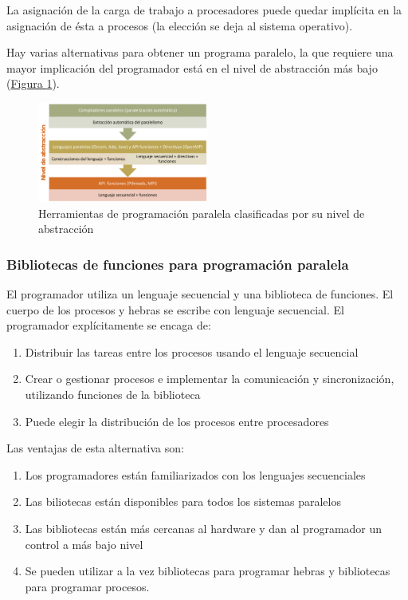 \documentclass[10pt,a4paper,spanish]{report}
\begin{document}
La asignación de la carga de trabajo a procesadores puede quedar implícita en la asignación de ésta a procesos (la elección se deja al sistema operativo).

Hay varias alternativas para obtener un programa paralelo, la que requiere una mayor implicación del programador está en el nivel de abstracción más bajo (\hyperref[herramientas_paralelas]{Figura \ref*{herramientas_paralelas}}).

\begin{figure}[!h]
\centering
\includegraphics[width=0.5\textwidth]{26}
\caption{Herramientas de programación paralela clasificadas por su nivel de abstracción}
\label{herramientas_paralelas}
\end{figure}

\textcolor[rgb]{0.2,0.4,0.8}{\subsubsection{Bibliotecas de funciones para programación paralela}}
El programador utiliza un lenguaje secuencial y una biblioteca de funciones. El cuerpo de los procesos y hebras se escribe con lenguaje secuencial. El programador explícitamente se encaga de: 
\begin{enumerate}[\color{azul}{\bf $\heartsuit$}]
    \item Distribuir las tareas entre los procesos usando el lenguaje secuencial
    \item Crear o gestionar procesos e implementar la comunicación y sincronización, utilizando funciones de la biblioteca
    \item Puede elegir la distribución de los procesos entre procesadores
\end{enumerate}

Las ventajas de esta alternativa son:
\begin{enumerate}[\color{azul}{\bf $\heartsuit$}]
    \item Los programadores están familiarizados con los lenguajes secuenciales
    \item Las biliotecas están disponibles para todos los sistemas paralelos
    \item Las bibliotecas están más cercanas al hardware y dan al programador un control a más bajo nivel
    \item Se pueden utilizar a la vez bibliotecas para programar hebras y bibliotecas para programar procesos.
\end{enumerate}
\end{document}
